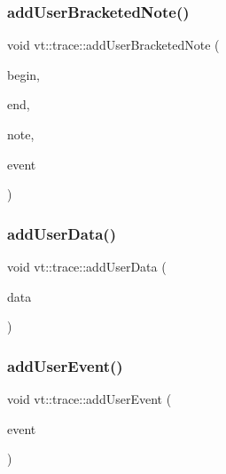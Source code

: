 \subsubsection{\texorpdfstring{add\+User\+Bracketed\+Note()}{addUserBracketedNote()}}
{\footnotesize\ttfamily void vt\+::trace\+::add\+User\+Bracketed\+Note (\begin{DoxyParamCaption}\item[{double const}]{begin,  }\item[{double const}]{end,  }\item[{std\+::string const \&}]{note,  }\item[{\hyperlink{namespacevt_1_1trace_a64a7185f3e102df8d8258f263ccd1582}{Trace\+Event\+I\+D\+Type} const}]{event }\end{DoxyParamCaption})}

\mbox{\label{namespacevt_1_1trace_a0ec1ac44fb179f29245a36b887f588f1}} 
\subsubsection{\texorpdfstring{add\+User\+Data()}{addUserData()}}
{\footnotesize\ttfamily void vt\+::trace\+::add\+User\+Data (\begin{DoxyParamCaption}\item[{int32\+\_\+t}]{data }\end{DoxyParamCaption})}

\mbox{\label{namespacevt_1_1trace_ac973a9573bd3cc0a3fead674a4551ac5}} 
\subsubsection{\texorpdfstring{add\+User\+Event()}{addUserEvent()}}
{\footnotesize\ttfamily void vt\+::trace\+::add\+User\+Event (\begin{DoxyParamCaption}\item[{\hyperlink{namespacevt_1_1trace_a5908920d051c144c89f17c69ed262350}{User\+Event\+I\+D\+Type}}]{event }\end{DoxyParamCaption})}

\mbox{\label{namespacevt_1_1trace_ab090a5c9eae800c6820c88b3fe56c9c8}} 
